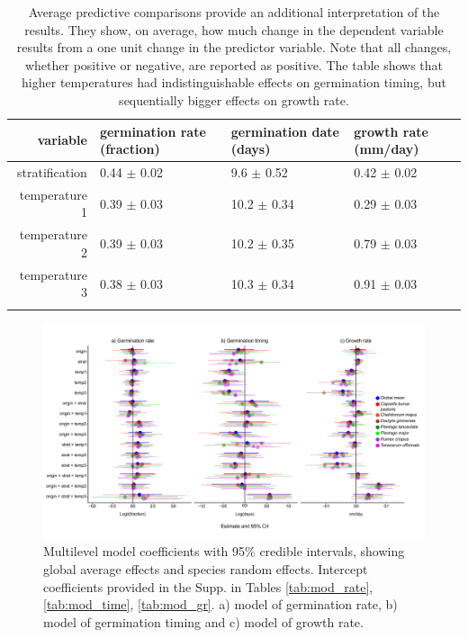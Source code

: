 \documentclass[12pt]{article}\usepackage[]{graphicx}\usepackage[]{color}
\begin{document}
\begin{longtable}{rlll} 
\caption{Average predictive comparisons provide an additional interpretation of the results. They show, on average, how much change in the dependent variable results from a one unit change in the predictor variable. Note that all changes, whether positive or negative, are reported as positive. The table shows that higher temperatures had indistinguishable effects on germination timing, but sequentially bigger effects on growth rate.}
\label{tab:apc}\\
	\hline
	variable & germination rate (fraction) & germination date (days) & growth rate (mm/day) \\ 
	\hline
	stratification & 0.44 $\pm$ 0.02 & 9.6 $\pm$ 0.52 & 0.42 $\pm$ 0.02 \\ 
	temperature 1 & 0.39 $\pm$ 0.03 & 10.2 $\pm$ 0.34 & 0.29 $\pm$ 0.03 \\ 
	temperature 2 & 0.39 $\pm$ 0.03 & 10.2 $\pm$ 0.35 & 0.79 $\pm$ 0.03 \\ 
	temperature 3 & 0.38 $\pm$ 0.03 & 10.3 $\pm$ 0.34 & 0.91 $\pm$ 0.03 \\ 
	\hline\\
	\hline
\end{longtable}

\begin{figure}
	\includegraphics[width=1.1\textheight, scale=.7]{germ_figs_onepage.pdf}
	\caption{Multilevel model coefficients with 95\% credible intervals, showing global average effects and species random effects. Intercept coefficients provided in the Supp. in Tables \ref{tab:mod_rate},\ref{tab:mod_time}, \ref{tab:mod_gr}.  a) model of germination rate, b) model of germination timing and c) model of growth rate.}
	\label{fig:coef}

\end{figure}
\end{document}
